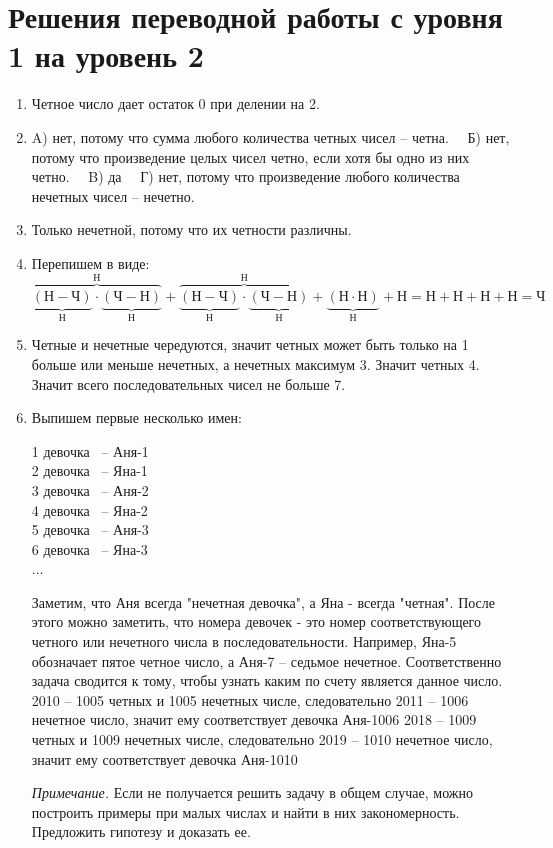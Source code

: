 \section{ Решения переводной работы с уровня 1 на уровень 2}
\begin{enumerate}
	\item Четное число дает остаток 0 при делении на 2.
	\item A) нет, потому что сумма любого количества четных чисел -- четна.~~ Б) нет, потому что произведение целых чисел четно, если хотя бы одно из них четно.~~ B) да ~~Г) нет, потому что произведение любого количества нечетных чисел -- нечетно.
	\item Только нечетной, потому что их четности различны.
	\item Перепишем в виде: $\overbrace{\underbrace{(Н-Ч)}_{Н}\cdot\underbrace{(Ч-Н)}_{Н}}^{Н}+\overbrace{\underbrace{(Н-Ч)}_{Н}\cdot\underbrace{(Ч-Н)}_{Н}}^{Н}+\underbrace{(Н\cdot Н)}_{Н}+Н=Н+Н+Н+Н=Ч$
	\item Четные и нечетные чередуются, значит четных может быть только на 1 больше или меньше нечетных, а нечетных максимум 3. Значит четных 4. Значит всего последовательных чисел не больше 7.
	\newpage
	\item Выпишем первые несколько имен:
	\begin{center}
		1 девочка  -- Аня-1\\
	2 девочка  -- Яна-1\\
	3 девочка  -- Аня-2\\
	4 девочка  -- Яна-2\\
	5 девочка  -- Аня-3\\
	6 девочка  -- Яна-3\\
	...\\
	\end{center}
Заметим, что Аня всегда "нечетная девочка", а Яна - всегда "четная". После этого можно заметить, что номера девочек - это номер соответствующего четного или нечетного числа в последовательности. Например, Яна-5 обозначает пятое четное число, а Аня-7 -- седьмое нечетное.
	Соответственно задача сводится к тому, чтобы узнать каким по счету является данное число.
	2010 -- 1005 четных и 1005 нечетных числе, следовательно 2011 -- 1006 нечетное число, значит ему соответствует девочка Аня-1006
	2018 -- 1009 четных и 1009 нечетных числе, следовательно 2019 -- 1010 нечетное число, значит ему соответствует девочка Аня-1010
	
	\textit{Примечание.} Если не получается решить задачу в общем случае, можно построить примеры при малых числах и найти в них закономерность. Предложить гипотезу и доказать ее.
\end{enumerate}